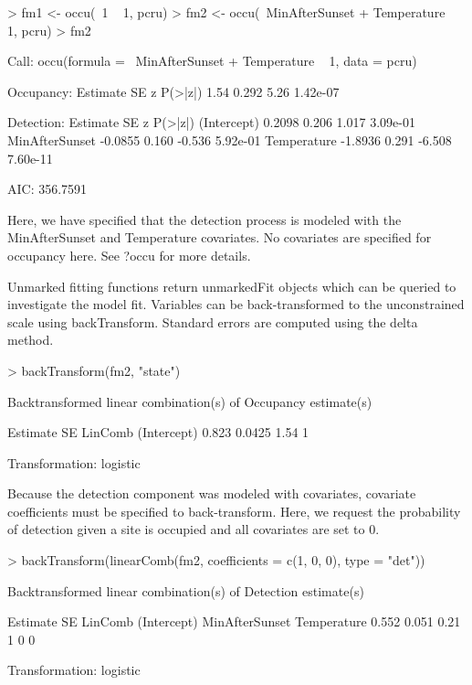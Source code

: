 \documentclass[a4paper]{article}
\renewenvironment{Schunk}{\vspace{\topsep}}{\vspace{\topsep}}
\begin{document}
\begin{Schunk}
\begin{Sinput}
> fm1 <- occu(~1 ~ 1, pcru)
> fm2 <- occu(~MinAfterSunset + Temperature ~ 1, pcru)
> fm2
\end{Sinput}
\begin{Soutput}
Call:
occu(formula = ~MinAfterSunset + Temperature ~ 1, data = pcru)

Occupancy:
 Estimate    SE    z  P(>|z|)
     1.54 0.292 5.26 1.42e-07

Detection:
               Estimate    SE      z  P(>|z|)
(Intercept)      0.2098 0.206  1.017 3.09e-01
MinAfterSunset  -0.0855 0.160 -0.536 5.92e-01
Temperature     -1.8936 0.291 -6.508 7.60e-11

AIC: 356.7591 
\end{Soutput}
\end{Schunk}

Here, we have specified that the detection process is modeled with the
MinAfterSunset and Temperature covariates.  No covariates are
specified for occupancy here.  See ?occu for more details.

Unmarked fitting functions return unmarkedFit objects which can be
queried to investigate the model fit.  Variables can be
back-transformed to the unconstrained scale using backTransform.
Standard errors are computed using the delta method.

\begin{Schunk}
\begin{Sinput}
> backTransform(fm2, "state")
\end{Sinput}
\begin{Soutput}
Backtransformed linear combination(s) of Occupancy estimate(s)

 Estimate     SE LinComb (Intercept)
    0.823 0.0425    1.54           1

Transformation: logistic 
\end{Soutput}
\end{Schunk}

Because the detection component was modeled with covariates, covariate
coefficients must be specified to back-transform.  Here, we request
the probability of detection given a site is occupied and all
covariates are set to 0.

\begin{Schunk}
\begin{Sinput}
> backTransform(linearComb(fm2, coefficients = c(1, 0, 
     0), type = "det"))
\end{Sinput}
\begin{Soutput}
Backtransformed linear combination(s) of Detection estimate(s)

 Estimate    SE LinComb (Intercept) MinAfterSunset Temperature
    0.552 0.051    0.21           1              0           0

Transformation: logistic 
\end{Soutput}
\end{Schunk}
\end{document}
